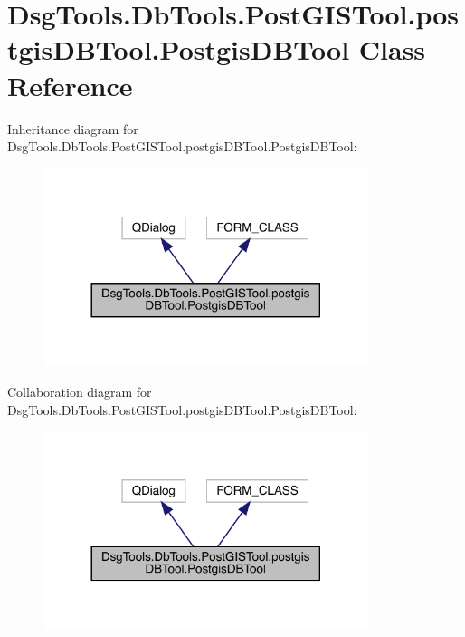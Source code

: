 \hypertarget{class_dsg_tools_1_1_db_tools_1_1_post_g_i_s_tool_1_1postgis_d_b_tool_1_1_postgis_d_b_tool}{}\section{Dsg\+Tools.\+Db\+Tools.\+Post\+G\+I\+S\+Tool.\+postgis\+D\+B\+Tool.\+Postgis\+D\+B\+Tool Class Reference}
\label{class_dsg_tools_1_1_db_tools_1_1_post_g_i_s_tool_1_1postgis_d_b_tool_1_1_postgis_d_b_tool}


Inheritance diagram for Dsg\+Tools.\+Db\+Tools.\+Post\+G\+I\+S\+Tool.\+postgis\+D\+B\+Tool.\+Postgis\+D\+B\+Tool\+:
\nopagebreak
\begin{figure}[H]
\begin{center}
\leavevmode
\includegraphics[width=269pt]{class_dsg_tools_1_1_db_tools_1_1_post_g_i_s_tool_1_1postgis_d_b_tool_1_1_postgis_d_b_tool__inherit__graph}
\end{center}
\end{figure}


Collaboration diagram for Dsg\+Tools.\+Db\+Tools.\+Post\+G\+I\+S\+Tool.\+postgis\+D\+B\+Tool.\+Postgis\+D\+B\+Tool\+:
\nopagebreak
\begin{figure}[H]
\begin{center}
\leavevmode
\includegraphics[width=269pt]{class_dsg_tools_1_1_db_tools_1_1_post_g_i_s_tool_1_1postgis_d_b_tool_1_1_postgis_d_b_tool__coll__graph}
\end{center}
\end{figure}
